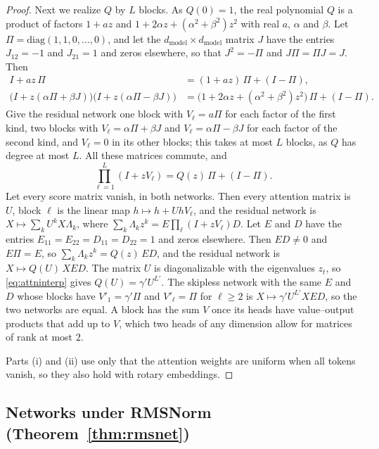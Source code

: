 \documentclass[10pt]{article}
\theoremstyle{definition}
\theoremstyle{remark}
\newcommand{\dm}{d_{\mathrm{model}}}
\begin{document}
\begin{proof}
Next we realize $Q$ by $L$ blocks. As $Q(0) = 1$, the real polynomial $Q$ is a product of factors $1 + az$ and $1 + 2\alpha z + (\alpha^2 + \beta^2)z^2$ with real $a$, $\alpha$ and $\beta$. Let $\Pi = \mathrm{diag}(1, 1, 0, \dots, 0)$, and let the $\dm\times\dm$ matrix $J$ have the entries $J_{12} = -1$ and $J_{21} = 1$ and zeros elsewhere, so that $J^2 = -\Pi$ and $J\Pi = \Pi J = J$. Then
\begin{align*}
I + az\,\Pi &= (1 + az)\,\Pi + (I - \Pi),\\
\big(I + z(\alpha\Pi + \beta J)\big)\big(I + z(\alpha\Pi - \beta J)\big) &= \big(1 + 2\alpha z + (\alpha^2 + \beta^2)z^2\big)\,\Pi + (I - \Pi).
\end{align*}
Give the residual network one block with $V_\ell = a\Pi$ for each factor of the first kind, two blocks with $V_\ell = \alpha\Pi + \beta J$ and $V_\ell = \alpha\Pi - \beta J$ for each factor of the second kind, and $V_\ell = 0$ in its other blocks; this takes at most $L$ blocks, as $Q$ has degree at most $L$. All these matrices commute, and
\[
\prod_{\ell=1}^{L}(I + zV_\ell) = Q(z)\,\Pi + (I - \Pi).
\]
Let every score matrix vanish, in both networks. Then every attention matrix is $U$, block $\ell$ is the linear map $h \mapsto h + UhV_\ell$, and the residual network is $X \mapsto \sum_k U^kX\Lambda_k$, where $\sum_k \Lambda_kz^k = E\prod_\ell(I + zV_\ell)D$. Let $E$ and $D$ have the entries $E_{11} = E_{22} = D_{11} = D_{22} = 1$ and zeros elsewhere. Then $ED \neq 0$ and $E\Pi = E$, so $\sum_k \Lambda_kz^k = Q(z)\,ED$, and the residual network is $X \mapsto Q(U)\,XED$. The matrix $U$ is diagonalizable with the eigenvalues $z_t$, so \cref{eq:attninterp} gives $Q(U) = \gamma'U^{L'}$. The skipless network with the same $E$ and $D$ whose blocks have $V'_1 = \gamma'\Pi$ and $V'_\ell = \Pi$ for $\ell \ge 2$ is $X \mapsto \gamma'U^{L'}XED$, so the two networks are equal. A block has the sum $V$ once its heads have value--output products that add up to $V$, which two heads of any dimension allow for matrices of rank at most $2$.

Parts (i) and (ii) use only that the attention weights are uniform when all tokens vanish, so they also hold with rotary embeddings.
\end{proof}


\subsection{Networks under RMSNorm\texorpdfstring{ (Theorem~\ref*{thm:rmsnet})}{}}\label{app:prf-epszero}
\end{document}
